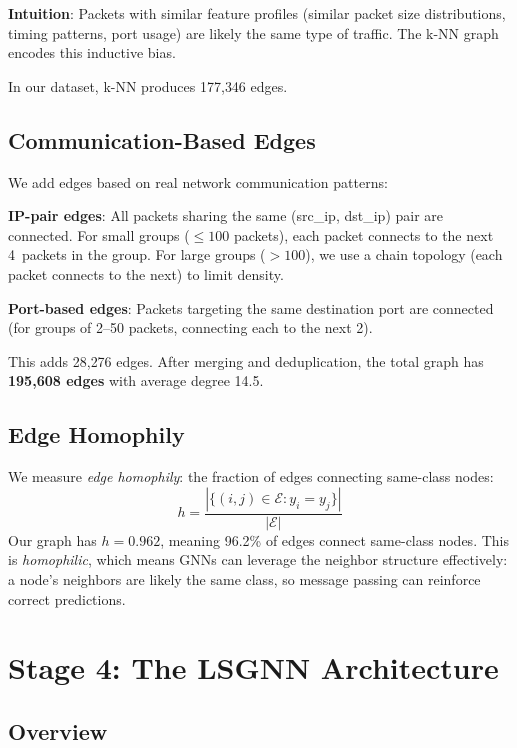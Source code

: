\documentclass[conference]{IEEEtran}
\newcommand{\E}{\mathcal{E}}
\begin{document}
\textbf{Intuition}: Packets with similar feature profiles (similar packet size distributions, timing patterns, port usage) are likely the same type of traffic. The k-NN graph encodes this inductive bias.

In our dataset, k-NN produces 177{,}346 edges.

\subsection{Communication-Based Edges}

We add edges based on real network communication patterns:

\textbf{IP-pair edges}: All packets sharing the same (src\_ip, dst\_ip) pair are connected. For small groups ($\leq 100$ packets), each packet connects to the next 4~packets in the group. For large groups ($> 100$), we use a chain topology (each packet connects to the next) to limit density.

\textbf{Port-based edges}: Packets targeting the same destination port are connected (for groups of 2--50 packets, connecting each to the next 2).

This adds 28{,}276 edges. After merging and deduplication, the total graph has \textbf{195{,}608 edges} with average degree 14.5.

\subsection{Edge Homophily}

We measure \emph{edge homophily}: the fraction of edges connecting same-class nodes:
\begin{equation}
    h = \frac{|\{(i,j) \in \E : y_i = y_j\}|}{|\E|}
\end{equation}
Our graph has $h = 0.962$, meaning 96.2\% of edges connect same-class nodes. This is \emph{homophilic}, which means GNNs can leverage the neighbor structure effectively: a node's neighbors are likely the same class, so message passing can reinforce correct predictions.

\section{Stage 4: The LSGNN Architecture}
\label{sec:lsgnn}

\subsection{Overview}
\end{document}
